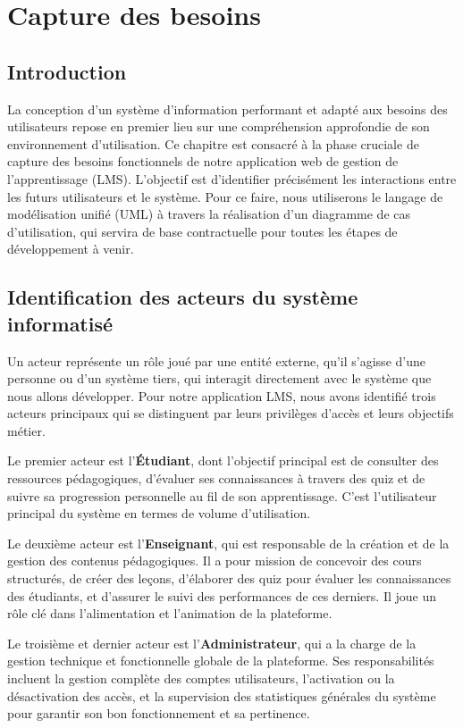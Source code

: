 \documentclass[12pt,a4paper]{report}
\begin{document}
\chapter{Capture des besoins}

\section{Introduction}
La conception d'un système d'information performant et adapté aux besoins des utilisateurs repose en premier lieu sur une compréhension approfondie de son environnement d'utilisation. Ce chapitre est consacré à la phase cruciale de capture des besoins fonctionnels de notre application web de gestion de l'apprentissage (LMS). L'objectif est d'identifier précisément les interactions entre les futurs utilisateurs et le système. Pour ce faire, nous utiliserons le langage de modélisation unifié (UML) à travers la réalisation d'un diagramme de cas d'utilisation, qui servira de base contractuelle pour toutes les étapes de développement à venir.

\section{Identification des acteurs du système informatisé}
Un acteur représente un rôle joué par une entité externe, qu'il s'agisse d'une personne ou d'un système tiers, qui interagit directement avec le système que nous allons développer. Pour notre application LMS, nous avons identifié trois acteurs principaux qui se distinguent par leurs privilèges d'accès et leurs objectifs métier.

Le premier acteur est l'\textbf{Étudiant}, dont l'objectif principal est de consulter des ressources pédagogiques, d'évaluer ses connaissances à travers des quiz et de suivre sa progression personnelle au fil de son apprentissage. C'est l'utilisateur principal du système en termes de volume d'utilisation.

Le deuxième acteur est l'\textbf{Enseignant}, qui est responsable de la création et de la gestion des contenus pédagogiques. Il a pour mission de concevoir des cours structurés, de créer des leçons, d'élaborer des quiz pour évaluer les connaissances des étudiants, et d'assurer le suivi des performances de ces derniers. Il joue un rôle clé dans l'alimentation et l'animation de la plateforme.

Le troisième et dernier acteur est l'\textbf{Administrateur}, qui a la charge de la gestion technique et fonctionnelle globale de la plateforme. Ses responsabilités incluent la gestion complète des comptes utilisateurs, l'activation ou la désactivation des accès, et la supervision des statistiques générales du système pour garantir son bon fonctionnement et sa pertinence.
\end{document}
